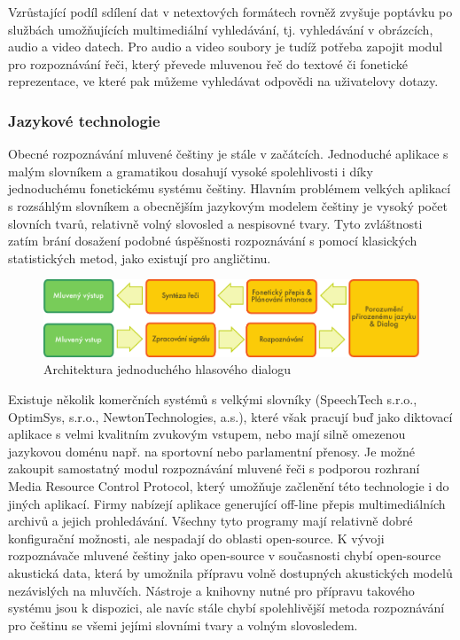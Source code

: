 \documentclass[]{../../metanetpaper}
\begin{document}
\begin{multicols}{2}
Vzrůstající podíl sdílení dat v netextových formátech rovněž zvyšuje poptávku po službách umožňujících multimediální vyhledávání, tj. vyhledávání v obrázcích, audio a video datech. Pro audio a video soubory je tudíž potřeba zapojit modul pro rozpoznávání řeči, který převede mluvenou řeč do textové či fonetické reprezentace, ve které pak můžeme vyhledávat odpovědi na uživatelovy dotazy.

\subsubsection{Jazykové technologie}

Obecné rozpoznávání mluvené češtiny je stále v začátcích. Jednoduché aplikace s malým slovníkem a gramatikou dosahují vysoké spolehlivosti i díky jednoduchému fonetickému systému češtiny. Hlavním problémem velkých aplikací s rozsáhlým slovníkem a obecnějším jazykovým modelem češtiny je vysoký počet slovních tvarů, relativně volný slovosled a nespisovné tvary. Tyto zvláštnosti zatím brání dosažení podobné úspěšnosti rozpoznávání s pomocí klasických statistických metod, jako existují pro angličtinu.
\begin{figure}[htb]
  \center
  \includegraphics[width=\textwidth]{../_media/czech/simple_speech-based_dialogue_architecture}
  \caption{Architektura jednoduchého hlasového dialogu}
  \label{fig:dialoguearch_en}
\end{figure}
Existuje několik komerčních systémů s velkými slovníky (SpeechTech s.r.o.\cite{Note11}, OptimSys, s.r.o.\cite{Note12}, NewtonTechnologies, a.s.\cite{Note13}), které však pracují buď jako diktovací aplikace s velmi kvalitním zvukovým vstupem, nebo mají silně omezenou jazykovou doménu např. na sportovní nebo parlamentní přenosy. Je možné zakoupit samostatný modul rozpoznávání mluvené řeči s podporou rozhraní Media Resource Control Protocol, který umožňuje začlenění této technologie i do jiných aplikací. Firmy nabízejí aplikace generující off-line přepis multimediálních archivů a jejich prohledávání. Všechny tyto programy mají relativně dobré konfigurační možnosti, ale nespadají do oblasti open-source. K vývoji rozpoznávače mluvené češtiny jako open-source v současnosti chybí open-source akustická data, která by umožnila přípravu volně dostupných akustických modelů nezávislých na mluvčích. Nástroje a knihovny nutné pro přípravu takového systému jsou k dispozici, ale navíc stále chybí spolehlivější metoda rozpoznávání pro češtinu se všemi jejími slovními tvary a volným slovosledem.\\

\end{multicols}
\end{document}
